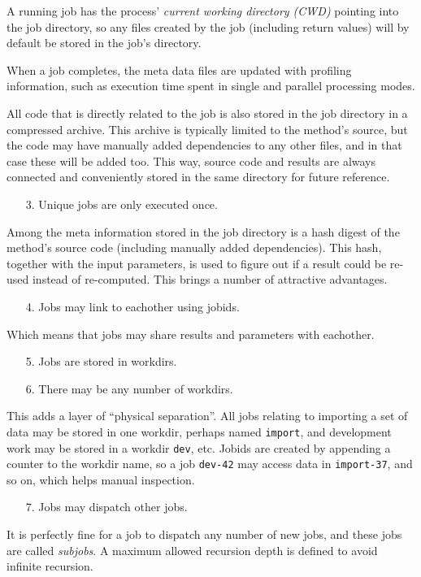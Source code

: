 A running job has the process' \textsl{current working directory
(CWD)} pointing into the job directory, so any files created by the
job (including return values) will by default be stored in the job's
directory.

When a job completes, the meta data files are updated with profiling
information, such as execution time spent in single and parallel
processing modes.

All code that is directly related to the job is also stored in the job
directory in a compressed archive.  This archive is typically limited
to the method's source, but the code may have manually added
dependencies to any other files, and in that case these will be added
too.  This way, source code and results are always connected and
conveniently stored in the same directory for future reference.
\begin{itemize}
\item[3.]  Unique jobs are only executed once.
\end{itemize}
Among the meta information stored in the job directory is a hash
digest of the method's source code (including manually added
dependencies).  This hash, together with the input parameters, is used
to figure out if a result could be re-used instead of re-computed.
This brings a number of attractive advantages.
\begin{itemize}
\item[4.]  Jobs may link to eachother using jobids.
\end{itemize}
Which means that jobs may share results and parameters with eachother.
\begin{itemize}
\item[5.]  Jobs are stored in workdirs.
\item[6.]  There may be any number of workdirs.
\end{itemize}
This adds a layer of ``physical separation''.  All jobs relating to
importing a set of data may be stored in one workdir, perhaps named
\texttt{import}, and development work may be stored in a workdir
\texttt{dev}, etc.  Jobids are created by appending a counter to the
workdir name, so a job \texttt{dev-42} may access data in
\texttt{import-37}, and so on, which helps manual inspection.
\begin{itemize}
\item[7.] Jobs may dispatch other jobs.
\end{itemize}
It is perfectly fine for a job to dispatch any number of new jobs, and
these jobs are called \textsl{subjobs}.  A maximum allowed recursion
depth is defined to avoid infinite recursion.



